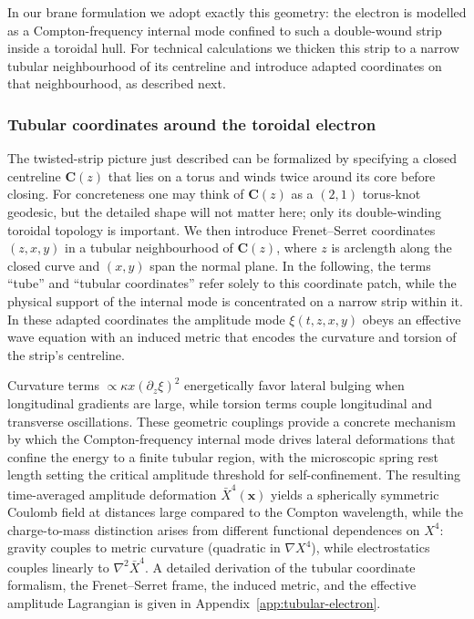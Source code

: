 In our brane formulation we adopt exactly this geometry: the electron is
modelled as a Compton-frequency internal mode confined to such a
double-wound strip inside a toroidal hull. For technical calculations we
thicken this strip to a narrow tubular neighbourhood of its centreline
and introduce adapted coordinates on that neighbourhood, as described
next.

\subsubsection{Tubular coordinates around the toroidal electron}
\label{subsec:tubular-electron}

The twisted-strip picture just described can be formalized by specifying
a closed centreline $\mathbf{C}(z)$ that lies on a torus and winds twice
around its core before closing. For concreteness one may think of
$\mathbf{C}(z)$ as a $(2,1)$ torus-knot geodesic, but the detailed
shape will not matter here; only its double-winding toroidal topology is
important. We then introduce Frenet--Serret coordinates $(z,x,y)$ in a
tubular neighbourhood of $\mathbf{C}(z)$, where $z$ is arclength along
the closed curve and $(x,y)$ span the normal plane. In the following,
the terms ``tube'' and ``tubular coordinates'' refer solely to this
coordinate patch, while the physical support of the internal mode is
concentrated on a narrow strip within it. In these adapted coordinates
the amplitude mode $\xi(t,z,x,y)$ obeys an effective wave equation with
an induced metric that encodes the curvature and torsion of the
strip's centreline.

Curvature terms
$\propto\kappa x(\partial_z\xi)^2$ energetically favor lateral bulging
when longitudinal gradients are large, while torsion terms couple
longitudinal and transverse oscillations. These geometric couplings
provide a concrete mechanism by which the Compton-frequency internal
mode drives lateral deformations that confine the energy to a finite
tubular region, with the microscopic spring rest length setting the
critical amplitude threshold for self-confinement. The resulting
time-averaged amplitude deformation $\bar{X}^4(\mathbf{x})$ yields a
spherically symmetric Coulomb field at distances large compared to the
Compton wavelength, while the charge-to-mass distinction arises from
different functional dependences on $X^4$: gravity couples to metric
curvature (quadratic in $\nabla X^4$), while electrostatics couples
linearly to $\nabla^2 \bar{X}^4$. A detailed derivation of the tubular
coordinate formalism, the Frenet--Serret frame, the induced metric, and
the effective amplitude Lagrangian is given in
Appendix~\ref{app:tubular-electron}.

